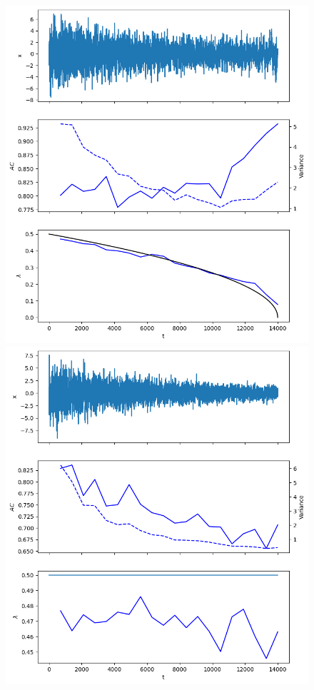 \documentclass[%
thesis=student,%
coverpage=false,%
titlepage=false,%
headmarks=true, %
english,%
font=libertine, %
math=newpxtx, %
BCOR=5mm,%
coverBCOR=11mm%
]{tumbook}
\begin{document}
\begin{figure}
    \begin{minipage}{0.49\textwidth}
        \centering
        \includegraphics[width=\textwidth]{figures/false_negative_var.png}
    \end{minipage}
    \hfill
    \begin{minipage}{0.49\textwidth}
        \centering
        \includegraphics[width=\textwidth]{figures/true_negative.png}

\end{minipage}
\end{figure}
\end{document}
